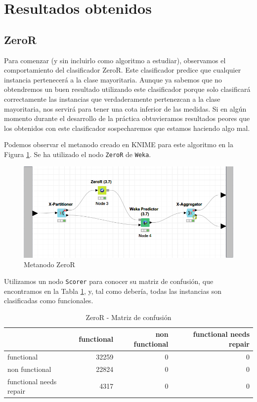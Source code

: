 \documentclass[a4paper, 20pt]{article}
\begin{document}
\section{Resultados obtenidos}
\subsection{ZeroR}
Para comenzar (y sin incluirlo como algoritmo a estudiar), observamos el comportamiento del clasificador ZeroR. Este clasificador predice que cualquier instancia pertenecerá a la clase mayoritaria. Aunque ya sabemos que no obtendremos un buen resultado utilizando este clasificador porque solo clasificará correctamente las instancias que verdaderamente pertenezcan a la clase mayoritaria, nos servirá para tener una cota inferior de las medidas. Si en algún momento durante el desarrollo de la práctica obtuvieramos resultados peores que los obtenidos con este clasificador sospecharemos que estamos haciendo algo mal.

Podemos observar el metanodo creado en KNIME para este algoritmo en la Figura \ref{fig:zeroR}. Se ha utilizado el nodo \texttt{ZeroR} de \texttt{Weka}.

\begin{figure}[H]
    \centering
    \includegraphics[width=1\textwidth]{ZeroR}
    \caption{Metanodo ZeroR}
    \label{fig:zeroR}
\end{figure}

Utilizamos un nodo \texttt{Scorer} para conocer su matriz de confusión, que encontramos en la Tabla \ref{tab:CMZeroR}, y, tal como debería, todas las instancias son clasificadas como funcionales.

\begin{table}[H]
  \centering
  \caption{ZeroR - Matriz de confusión}
  \label{tab:CMZeroR}
  \begin{tabular}{lrrr}
    \toprule
    & functional & non functional & functional needs repair\\ \midrule
    functional & 32259 & 0 & 0\\
    non functional & 22824 & 0 & 0\\
    functional needs repair & 4317 & 0 & 0\\
    \bottomrule
  \end{tabular}
\end{table}
\end{document}

